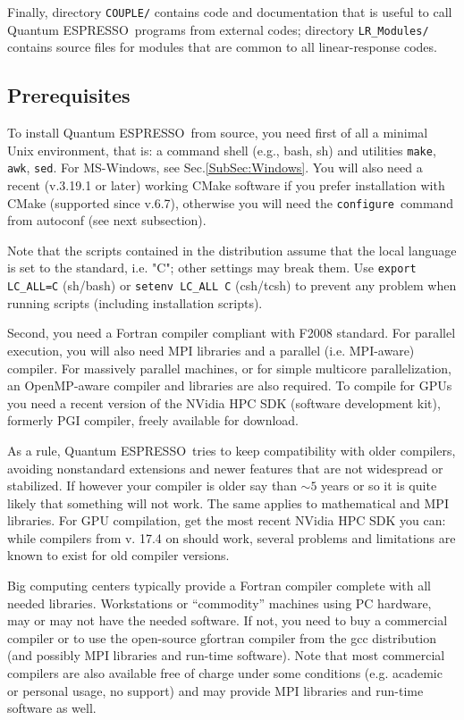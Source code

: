\documentclass[12pt,a4paper]{article}
\def\qe{{\sc Quantum ESPRESSO}}
\def\configure{\texttt{configure}}
\def\make{\texttt{make}}
\begin{document}
Finally, directory \texttt{COUPLE/} contains code and documentation
that is useful to call \qe\ programs from external codes; directory
\texttt{LR\_Modules/} contains source files for modules that are common
to all linear-response codes.
\subsection{Prerequisites}
\label{Sec:Installation}

To install \qe\ from source, you need first of all a minimal Unix
environment, that is: a command shell (e.g., bash, sh) and utilities \make,
\texttt{awk}, \texttt{sed}. For MS-Windows, see Sec.\ref{SubSec:Windows}.
You will also need a recent (v.3.19.1 or later) working CMake software 
if you prefer installation 
with CMake (supported since v.6.7), otherwise you will need the
\configure\ command from autoconf (see next subsection).

Note that the scripts contained
in the distribution assume that the local  language is set to the
standard, i.e. "C"; other settings
may break them. Use \texttt{export LC\_ALL=C} (sh/bash) or
\texttt{setenv LC\_ALL C} (csh/tcsh) to prevent any problem
when running scripts (including installation scripts).

Second, you need a Fortran compiler compliant with F2008 standard.
For parallel execution, you will also need MPI libraries and a parallel
(i.e. MPI-aware) compiler. For massively parallel machines, or
for simple multicore parallelization, an OpenMP-aware compiler
and libraries are also required. To compile for GPUs you need a
recent version of the NVidia HPC SDK (software development kit),
formerly PGI compiler, freely available for download.

As a rule, \qe\ tries to keep compatibility with older compilers,
avoiding nonstandard extensions and newer features that are not
widespread or stabilized. If however your compiler is older say
than $\sim 5$ years or so it is quite likely that something will
not work. The same applies to mathematical and MPI libraries.
For GPU compilation, get the most recent NVidia HPC SDK you can:
while compilers from v. 17.4 on should work, several problems and
limitations are known to exist for old compiler versions.

Big computing centers typically provide a Fortran compiler complete
with all needed libraries. Workstations or ``commodity'' machines
using PC hardware, may or may not have the needed software. If not,
you need to buy a commercial compiler or to use the open-source gfortran
compiler from the gcc distribution (and possibly MPI libraries and run-time
software). Note that most commercial compilers are also available
free of charge under some conditions (e.g. academic or personal usage, no
support) and may provide MPI libraries and run-time software as well.
\end{document}
